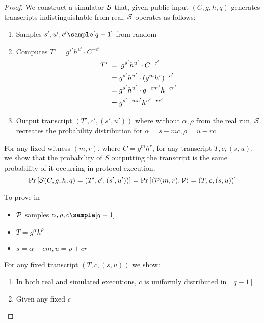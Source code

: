 \begin{proof}
    We construct a simulator $\mathcal{S}$ that, given public input $(C, g, h, q)$ generates transcripts indistinguishable from real.  $\mathcal{S}$ operates as follows:
    \begin{enumerate}
        \item Samples $s', u', c' \sample [q-1]$ from random
        \item Computes $T' = g^{s'}h^{u'} \cdot C^{-{c'}} $
        \begin{align}
            T' \; &= \; g^{s'}h^{u'} \cdot C^{-{c'}} \notag \\
            &= g^{s'}h^{u'} \cdot (g^mh^r)^{-{c'}} \notag \\
            &= g^{s'}h^{u'} \cdot g^{-cm'}h^{-cr'} \notag \\
            &= g^{s'-mc'}h^{u'-rc'} \notag \\
        \end{align} 
        \item Output transcript $(T', c', (s', u'))$ where without $\alpha, \rho$ from the real run, $\mathcal{S}$ recreates the probability distribution for $\alpha = s - mc, \rho = u - rc$
    \end{enumerate}

    For any fixed witness $(m,r)$, where $C = g^mh^r$,  for any transcript $T, c, (s,u)$, we show that the probability of $S$ outputting the transcript is the same probability of it occurring in protocol execution. 
\[
\Pr \left[ \mathcal{S}(C, g, h, q) = (T',c',(s',u')) \right] = \Pr \left[ \langle \mathcal{P}(m,r),\mathcal{V} \rangle = (T,c,(s,u)) \right]
\]

To prove in
\begin{itemize}
    \item $\mathcal{P}$ samples $\alpha, \rho, c \sample [q-1]$
    \item $T = g^{\alpha}h^{\rho}$
    \item $s = \alpha + cm, u = \rho + cr$
\end{itemize}

For any fixed transcript $(T, c, (s,u))$ we show:
\begin{enumerate}
    \item In both real and simulated executions, $c$ is uniformly distributed in $[q-1]$
    \item Given any fixed $c$
\end{enumerate}


\end{proof}































